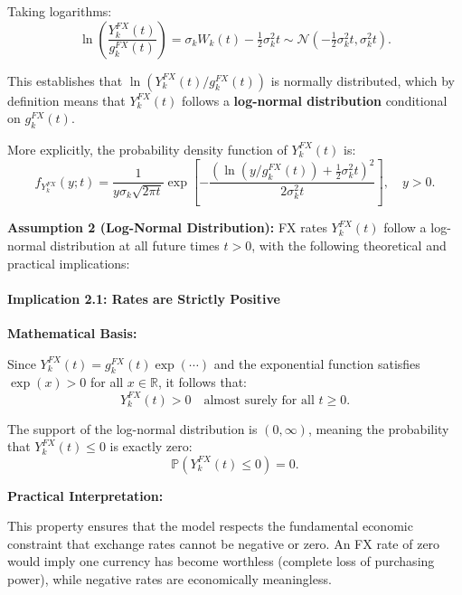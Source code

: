 Taking logarithms:
\begin{equation}
	\ln\!\left(\frac{Y_k^{FX}(t)}{g_k^{FX}(t)}\right) = \sigma_k W_k(t) - \tfrac{1}{2}\sigma_k^2 t \sim \mathcal{N}\!\left(-\tfrac{1}{2}\sigma_k^2 t, \sigma_k^2 t\right).
\end{equation}

This establishes that $\ln(Y_k^{FX}(t)/g_k^{FX}(t))$ is normally distributed, which by definition means that $Y_k^{FX}(t)$ follows a \textbf{log-normal distribution} conditional on $g_k^{FX}(t)$.

More explicitly, the probability density function of $Y_k^{FX}(t)$ is:
\begin{equation}
	f_{Y_k^{FX}}(y; t) = \frac{1}{y\sigma_k\sqrt{2\pi t}} \exp\!\left[-\frac{\left(\ln(y/g_k^{FX}(t)) + \frac{1}{2}\sigma_k^2 t\right)^2}{2\sigma_k^2 t}\right], \quad y > 0.
\end{equation}

\textbf{Assumption 2 (Log-Normal Distribution):} FX rates $Y_k^{FX}(t)$ follow a log-normal distribution at all future times $t > 0$, with the following theoretical and practical implications:

\paragraph{Implication 2.1: Rates are Strictly Positive}

\textbf{Mathematical Basis:}

Since $Y_k^{FX}(t) = g_k^{FX}(t) \exp(\cdots)$ and the exponential function satisfies $\exp(x) > 0$ for all $x \in \mathbb{R}$, it follows that:
\begin{equation}
	Y_k^{FX}(t) > 0 \quad \text{almost surely for all } t \geq 0.
\end{equation}

The support of the log-normal distribution is $(0, \infty)$, meaning the probability that $Y_k^{FX}(t) \leq 0$ is exactly zero:
\begin{equation}
	\mathbb{P}(Y_k^{FX}(t) \leq 0) = 0.
\end{equation}

\textbf{Practical Interpretation:}

This property ensures that the model respects the fundamental economic constraint that exchange rates cannot be negative or zero. An FX rate of zero would imply one currency has become worthless (complete loss of purchasing power), while negative rates are economically meaningless.

